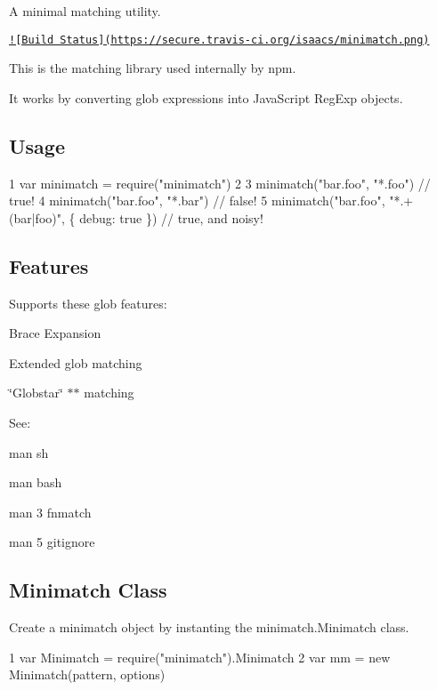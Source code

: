 A minimal matching utility.

\href{http://travis-ci.org/isaacs/minimatch}{\tt !\mbox{[}Build Status\mbox{]}(https\+://secure.\+travis-\/ci.\+org/isaacs/minimatch.\+png)}

This is the matching library used internally by npm.

It works by converting glob expressions into Java\+Script {\ttfamily Reg\+Exp} objects.

\subsection*{Usage}


\begin{DoxyCode}
1 var minimatch = require("minimatch")
2 
3 minimatch("bar.foo", "*.foo") // true!
4 minimatch("bar.foo", "*.bar") // false!
5 minimatch("bar.foo", "*.+(bar|foo)", \{ debug: true \}) // true, and noisy!
\end{DoxyCode}


\subsection*{Features}

Supports these glob features\+:


\begin{DoxyItemize}
\item Brace Expansion
\item Extended glob matching
\item \char`\"{}\+Globstar\char`\"{} {\ttfamily $\ast$$\ast$} matching
\end{DoxyItemize}

See\+:


\begin{DoxyItemize}
\item {\ttfamily man sh}
\item {\ttfamily man bash}
\item {\ttfamily man 3 fnmatch}
\item {\ttfamily man 5 gitignore}
\end{DoxyItemize}

\subsection*{Minimatch Class}

Create a minimatch object by instanting the {\ttfamily minimatch.\+Minimatch} class.


\begin{DoxyCode}
1 var Minimatch = require("minimatch").Minimatch
2 var mm = new Minimatch(pattern, options)
\end{DoxyCode}


